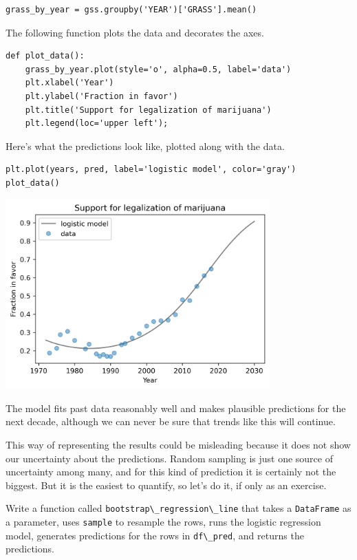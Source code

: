 \begin{lstlisting}[]
grass_by_year = gss.groupby('YEAR')['GRASS'].mean()
\end{lstlisting}

The following function plots the data and decorates the axes.

\begin{lstlisting}[]
def plot_data():
    grass_by_year.plot(style='o', alpha=0.5, label='data')
    plt.xlabel('Year')
    plt.ylabel('Fraction in favor')
    plt.title('Support for legalization of marijuana')
    plt.legend(loc='upper left');
\end{lstlisting}

Here's what the predictions look like, plotted along with the data.

\begin{lstlisting}[]
plt.plot(years, pred, label='logistic model', color='gray')
plot_data()
\end{lstlisting}

\begin{center}
\includegraphics[width=4in]{12_bootstrap_files/12_bootstrap_144_0.png}
\end{center}

The model fits past data reasonably well and makes plausible predictions
for the next decade, although we can never be sure that trends like this
will continue.

This way of representing the results could be misleading because it does
not show our uncertainty about the predictions. Random sampling is just
one source of uncertainty among many, and for this kind of prediction it
is certainly not the biggest. But it is the easiest to quantify, so
let's do it, if only as an exercise.

Write a function called
\passthrough{\lstinline!bootstrap\_regression\_line!} that takes a
\passthrough{\lstinline!DataFrame!} as a parameter, uses
\passthrough{\lstinline!sample!} to resample the rows, runs the logistic
regression model, generates predictions for the rows in
\passthrough{\lstinline!df\_pred!}, and returns the predictions.

